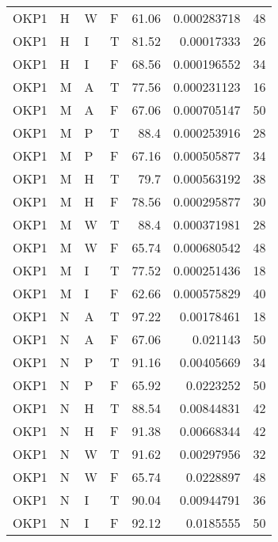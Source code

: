 \begin{table}[htb!]
{\begin{tabular}{llllrrr}
            OKP1     & H     & W     & F          & 61.06      & 0.000283718 & 48       \\
            OKP1     & H     & I     & T          & 81.52      & 0.00017333  & 26       \\
            OKP1     & H     & I     & F          & 68.56      & 0.000196552 & 34       \\
            OKP1     & M     & A     & T          & 77.56      & 0.000231123 & 16       \\
            OKP1     & M     & A     & F          & 67.06      & 0.000705147 & 50       \\
            OKP1     & M     & P     & T          & 88.4       & 0.000253916 & 28       \\
            OKP1     & M     & P     & F          & 67.16      & 0.000505877 & 34       \\
            OKP1     & M     & H     & T          & 79.7       & 0.000563192 & 38       \\
            OKP1     & M     & H     & F          & 78.56      & 0.000295877 & 30       \\
            OKP1     & M     & W     & T          & 88.4       & 0.000371981 & 28       \\
            OKP1     & M     & W     & F          & 65.74      & 0.000680542 & 48       \\
            OKP1     & M     & I     & T          & 77.52      & 0.000251436 & 18       \\
            OKP1     & M     & I     & F          & 62.66      & 0.000575829 & 40       \\
            OKP1     & N     & A     & T          & 97.22      & 0.00178461  & 18       \\
            OKP1     & N     & A     & F          & 67.06      & 0.021143    & 50       \\
            OKP1     & N     & P     & T          & 91.16      & 0.00405669  & 34       \\
            OKP1     & N     & P     & F          & 65.92      & 0.0223252   & 50       \\
            OKP1     & N     & H     & T          & 88.54      & 0.00844831  & 42       \\
            OKP1     & N     & H     & F          & 91.38      & 0.00668344  & 42       \\
            OKP1     & N     & W     & T          & 91.62      & 0.00297956  & 32       \\
            OKP1     & N     & W     & F          & 65.74      & 0.0228897   & 48       \\
            OKP1     & N     & I     & T          & 90.04      & 0.00944791  & 36       \\
            OKP1     & N     & I     & F          & 92.12      & 0.0185555   & 50       \\
            \hline
        \end{tabular}
    }{
    }
\end{table} 
